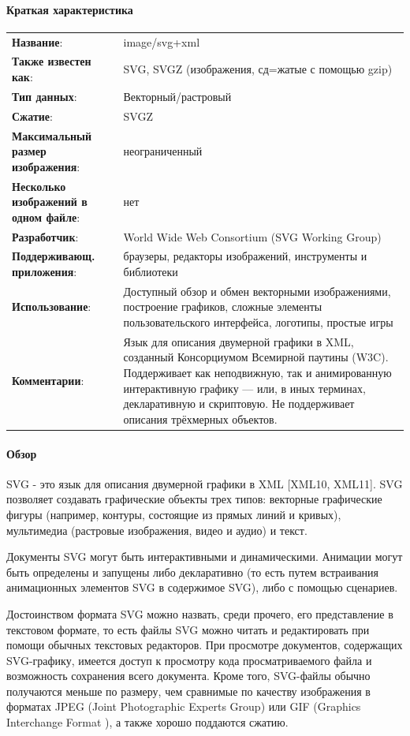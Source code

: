 \paragraph{Краткая характеристика}

\begin{longtable}{p{110pt} p{340pt}}
	\label{tab:svg}
	\centering
	\textbf{Название}:&image/svg+xml\\
	\textbf{Также известен как}:&SVG, SVGZ (изображения, сд=жатые с помощью gzip)\\
	\textbf{Тип данных}:&Векторный/растровый\\
	\textbf{Сжатие}:&SVGZ\\
	\textbf{Максимальный размер изображения}:&неограниченный\\
	\textbf{Несколько изображений в одном файле}:&нет\\
	\textbf{Разработчик}:&World Wide Web Consortium (SVG Working Group)\\
	\textbf{Поддерживающ. приложения}:&браузеры, редакторы изображений, инструменты и библиотеки\\
	\textbf{Использование}:&Доступный обзор и обмен векторными изображениями, построение графиков, сложные элементы пользовательского интерфейса, логотипы, простые игры\\
	\textbf{Комментарии}:&Язык для описания двумерной графики в XML, созданный Консорциумом Всемирной паутины (W3C). Поддерживает как неподвижную, так и анимированную интерактивную графику — или, в иных терминах, декларативную и скриптовую. Не поддерживает описания трёхмерных объектов.\\
\end{longtable}

\paragraph{Обзор}

SVG - это язык для описания двумерной графики в XML [XML10, XML11]. SVG позволяет создавать графические объекты трех типов: векторные графические фигуры (например, контуры, состоящие из прямых линий и кривых), мультимедиа (растровые изображения, видео и аудио) и текст.

Документы SVG могут быть интерактивными и динамическими. Анимации могут быть определены и запущены либо декларативно (то есть путем встраивания анимационных элементов SVG в содержимое SVG), либо с помощью сценариев.

Достоинством формата SVG можно назвать, среди прочего, его представление в текстовом формате, то есть файлы SVG можно читать и редактировать при помощи обычных текстовых редакторов. При просмотре документов, содержащих SVG-графику, имеется доступ к просмотру кода просматриваемого файла и возможность сохранения всего документа. Кроме того, SVG-файлы обычно получаются меньше по размеру, чем сравнимые по качеству изображения в форматах JPEG (Joint Photographic Experts Group) или GIF (Graphics Interchange Format ), а также хорошо поддаются сжатию.


